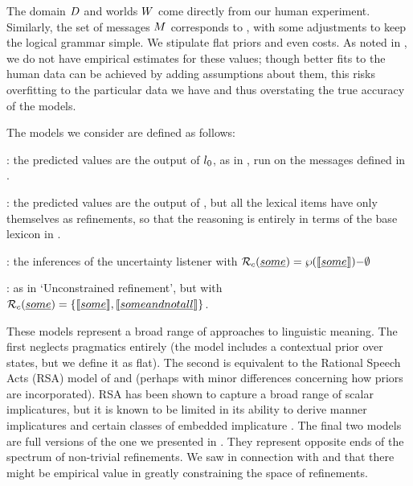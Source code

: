 \documentclass[leqno]{article}
\begin{document}
The domain $D$ and worlds $W$ come directly from our human
experiment. Similarly, the set of messages $M$ corresponds to
, with some adjustments to keep the logical grammar
simple. We stipulate flat priors and even costs. As noted in
, we do not have empirical estimates for these
values; though better fits to the human data can be achieved by adding
assumptions about them, this risks overfitting to the particular data
we have and thus overstating the true accuracy of the models.

The models we consider are defined as follows:
%
\begin{examples}
\item 
  \begin{examples}
  \item {}: the predicted values are the output
    of $l_{0}$, as in , run on the messages
    defined in .
  \item {}: the predicted values are the
    output of , but all the lexical items have only
    themselves as refinements, so that the reasoning is entirely in
    terms of the base lexicon in .
  \item {}: the inferences of the
    uncertainty listener  with $\mathcal{R}_{c}(\emph{some})
    = \wp(\llbracket\emph{some}\rrbracket){-}\emptyset$
  \item {}: as in `Unconstrained
    refinement', but with $\mathcal{R}_{c}(\emph{some}) =
    \left\{ \llbracket\emph{some}\rrbracket, \llbracket\emph{some and not all}\rrbracket \right\}$.
  \end{examples}
\end{examples}

These models represent a broad range of approaches to linguistic
meaning. The first neglects pragmatics entirely (the model includes a
contextual prior over states, but we define it as flat). The second is
equivalent to the Rational Speech Acts (RSA) model of
\citet{Frank:Goodman:2012} and \citet{Goodman:Stuhlmuller:2013}
(perhaps with minor differences concerning how priors are
incorporated). RSA has been shown to capture a broad range of scalar
implicatures, but it is known to be limited in its ability to derive
manner implicatures and certain classes of embedded implicature
\citep{Bergen:Goodman:Levy:2012,Bergen:Levy:Goodman:2014}. The final
two models are full versions of the one we presented in
. They represent opposite ends of the spectrum of
non-trivial refinements. We saw in connection with
 and  that there
might be empirical value in greatly constraining the space of
refinements.
\end{document}
